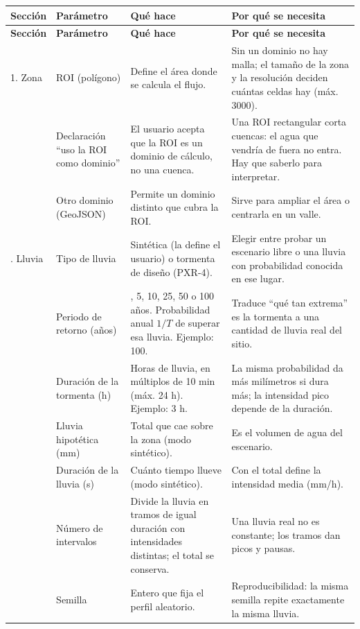 \documentclass[11pt,letterpaper]{article}
\begin{document}
{\small
\renewcommand{\arraystretch}{1.25}
\begin{longtable}{>{\raggedright\arraybackslash}p{2.1cm}>{\raggedright\arraybackslash}p{3.0cm}>{\raggedright\arraybackslash}p{5.3cm}>{\raggedright\arraybackslash}p{5.2cm}}
\toprule
\textbf{Sección} & \textbf{Parámetro} & \textbf{Qué hace} & \textbf{Por qué se necesita}\\
\midrule
\endfirsthead
\toprule
\textbf{Sección} & \textbf{Parámetro} & \textbf{Qué hace} & \textbf{Por qué se necesita}\\
\midrule
\endhead
\bottomrule
\endfoot
1. Zona & ROI (polígono) & Define el área donde se calcula el flujo. & Sin un dominio no hay malla; el tamaño de la zona y la resolución deciden cuántas celdas hay (máx. 3000).\\
 & Declaración ``uso la ROI como dominio'' & El usuario acepta que la ROI es un dominio de cálculo, no una cuenca. & Una ROI rectangular corta cuencas: el agua que vendría de fuera no entra. Hay que saberlo para interpretar.\\
 & Otro dominio (GeoJSON) & Permite un dominio distinto que cubra la ROI. & Sirve para ampliar el área o centrarla en un valle.\\
2. Lluvia & Tipo de lluvia & Sintética (la define el usuario) o tormenta de diseño (PXR-4). & Elegir entre probar un escenario libre o una lluvia con probabilidad conocida en ese lugar.\\
 & Periodo de retorno (años) & 2, 5, 10, 25, 50 o 100 años. Probabilidad anual $1/T$ de superar esa lluvia. Ejemplo: 100. & Traduce ``qué tan extrema'' es la tormenta a una cantidad de lluvia real del sitio.\\
 & Duración de la tormenta (h) & Horas de lluvia, en múltiplos de 10 min (máx. 24 h). Ejemplo: 3 h. & La misma probabilidad da más milímetros si dura más; la intensidad pico depende de la duración.\\
 & Lluvia hipotética (mm) & Total que cae sobre la zona (modo sintético). & Es el volumen de agua del escenario.\\
 & Duración de la lluvia (s) & Cuánto tiempo llueve (modo sintético). & Con el total define la intensidad media (mm/h).\\
 & Número de intervalos & Divide la lluvia en tramos de igual duración con intensidades distintas; el total se conserva. & Una lluvia real no es constante; los tramos dan picos y pausas.\\
 & Semilla & Entero que fija el perfil aleatorio. & Reproducibilidad: la misma semilla repite exactamente la misma lluvia.\\

\end{longtable}}
\end{document}
